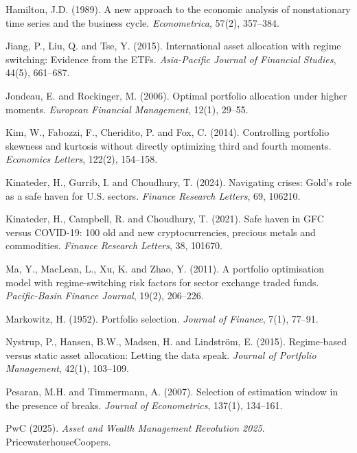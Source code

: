 \documentclass[12pt, a4paper]{article}
\begin{document}
\begin{description}[leftmargin=2em, itemsep=2pt]
\item Hamilton, J.D. (1989). A new approach to the economic analysis of nonstationary time
  series and the business cycle. \textit{Econometrica}, 57(2), 357--384.

\item Jiang, P., Liu, Q. and Tse, Y. (2015). International asset allocation with regime
  switching: Evidence from the ETFs. \textit{Asia-Pacific Journal of Financial Studies},
  44(5), 661--687.

\item Jondeau, E. and Rockinger, M. (2006). Optimal portfolio allocation under higher
  moments. \textit{European Financial Management}, 12(1), 29--55.

\item Kim, W., Fabozzi, F., Cheridito, P. and Fox, C. (2014). Controlling portfolio skewness
  and kurtosis without directly optimizing third and fourth moments.
  \textit{Economics Letters}, 122(2), 154--158.

\item Kinateder, H., Gurrib, I. and Choudhury, T. (2024). Navigating crises: Gold's role as a safe haven for U.S. sectors. \textit{Finance Research Letters}, 69, 106210.

\item Kinateder, H., Campbell, R. and Choudhury, T. (2021). Safe haven in GFC versus
  COVID-19: 100 old and new cryptocurrencies, precious metals and commodities.
  \textit{Finance Research Letters}, 38, 101670.

\item Ma, Y., MacLean, L., Xu, K. and Zhao, Y. (2011). A portfolio optimisation model with
  regime-switching risk factors for sector exchange traded funds.
  \textit{Pacific-Basin Finance Journal}, 19(2), 206--226.

\item Markowitz, H. (1952). Portfolio selection. \textit{Journal of Finance}, 7(1), 77--91.

\item Nystrup, P., Hansen, B.W., Madsen, H. and Lindstr{\"o}m, E. (2015). Regime-based
  versus static asset allocation: Letting the data speak.
  \textit{Journal of Portfolio Management}, 42(1), 103--109.

\item Pesaran, M.H. and Timmermann, A. (2007). Selection of estimation window in the
  presence of breaks. \textit{Journal of Econometrics}, 137(1), 134--161.

\item PwC (2025). \textit{Asset and Wealth Management Revolution 2025}.
  PricewaterhouseCoopers.


\end{description}
\end{document}
